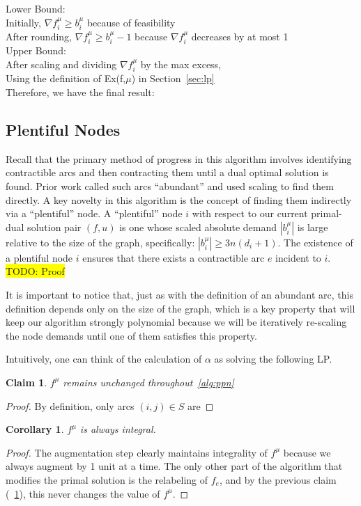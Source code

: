 \documentclass{article}
\newtheorem{corollary}{Corollary}[theorem]
\newtheorem{claim}[theorem]{Claim}
\newcommand{\todo}[1]{\colorbox{yellow}{TODO: #1}}
\begin{document}
    	Lower Bound: \\
    	Initially, $\nabla f_i^\mu \geq b_i^\mu$ because of feasibility \\
        After rounding, $\nabla f_i^\mu \geq b_i^\mu - 1$ because $\nabla f_i^\mu$ decreases by at most 1 \\
        Upper Bound: \\
        After scaling and dividing $\nabla f_i^\mu$ by the max excess, \\
        Using the definition of Ex(f,$\mu$) in Section~\ref{sec:lp} \\
        Therefore, we have the final result:  %
    	

 
    
    \subsection{Plentiful Nodes}
Recall that the primary method of progress in this algorithm involves identifying contractible arcs and then contracting them until a dual optimal solution is found. Prior work called such arcs ``abundant'' and used scaling to find them directly. A key novelty in this algorithm is the concept of finding them indirectly via a ``plentiful'' node. A ``plentiful'' node $i$ with respect to our current primal-dual solution pair $(f,u)$ is one whose scaled absolute demand $|b_i^{\mu}|$ is large relative to the size of the graph, specifically: $|b_i^{\mu}| \ge 3n(d_i + 1)$. The existence of a plentiful node $i$ ensures that there exists a contractible arc $e$ incident to $i$. \todo{Proof}

It is important to notice that, just as with the definition of an abundant  arc, this definition depends only on the size of the graph, which is a key property that will keep our algorithm strongly polynomial because we will be iteratively re-scaling the node demands until one of them satisfies this property.

Intuitively, one can think of the calculation of $\alpha$ as solving the following LP.

\begin{claim}
$f^{\mu}$ remains unchanged throughout~\ref{alg:ppn}
\label{claim:fsame}
\end{claim} 
\begin{proof}
By definition, only arcs $(i,j) \in S$ are 
\end{proof}
\begin{corollary}
$f^{\mu}$ is always integral.
\end{corollary}
\begin{proof}
The augmentation step clearly maintains integrality of $f^{\mu}$ because we always augment by 1 unit at a time. The only other part of the algorithm that modifies the primal solution is the relabeling of $f_e$, and by the previous claim (~\ref{claim:fsame}), this never changes the value of $f^{\mu}$.
\end{proof}
\end{document}
